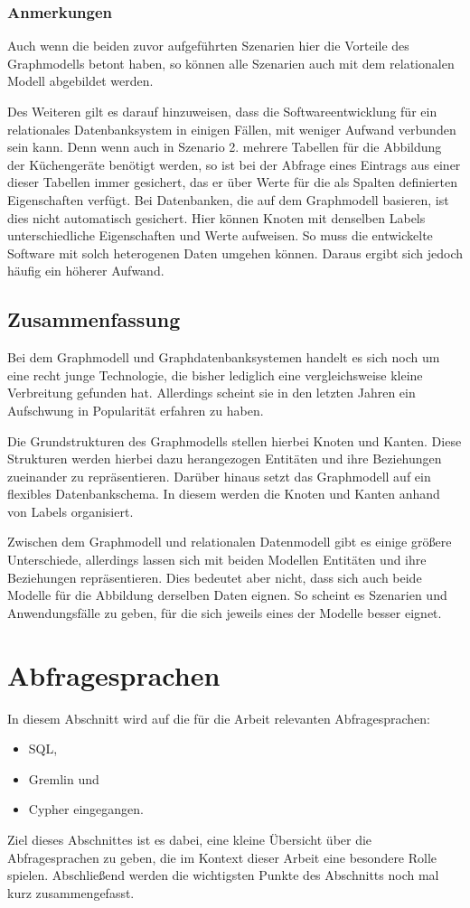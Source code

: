 \subsubsection{Anmerkungen}
Auch wenn die beiden zuvor aufgeführten Szenarien hier die Vorteile des Graphmodells betont haben, so können alle Szenarien auch mit dem relationalen Modell abgebildet werden. 

Des Weiteren gilt es darauf hinzuweisen, dass die Softwareentwicklung für ein relationales Datenbanksystem in einigen Fällen, mit weniger Aufwand verbunden sein kann. Denn wenn auch in Szenario 2. mehrere Tabellen für die Abbildung der Küchengeräte benötigt werden, so ist bei der Abfrage eines Eintrags aus einer dieser Tabellen immer gesichert, das er über Werte für die als Spalten definierten Eigenschaften verfügt. Bei Datenbanken, die auf dem Graphmodell basieren, ist dies nicht automatisch gesichert. Hier können Knoten mit denselben Labels unterschiedliche Eigenschaften und Werte aufweisen. So muss die entwickelte Software mit solch heterogenen Daten umgehen können. Daraus ergibt sich jedoch häufig ein höherer Aufwand. 

\subsection{Zusammenfassung}
Bei dem Graphmodell und Graphdatenbanksystemen handelt es sich noch um eine recht junge Technologie, die bisher lediglich eine vergleichsweise kleine Verbreitung gefunden hat. Allerdings scheint sie in den letzten Jahren ein Aufschwung in Popularität erfahren zu haben. 

Die Grundstrukturen des Graphmodells stellen hierbei Knoten und Kanten. Diese Strukturen werden hierbei dazu herangezogen Entitäten und ihre Beziehungen zueinander zu repräsentieren. Darüber hinaus setzt das Graphmodell auf ein flexibles Datenbankschema. In diesem werden die Knoten und Kanten anhand von Labels organisiert.

Zwischen dem Graphmodell und relationalen Datenmodell gibt es einige größere Unterschiede, allerdings lassen sich mit beiden Modellen Entitäten und ihre Beziehungen repräsentieren. Dies bedeutet aber nicht, dass sich auch beide Modelle für die Abbildung derselben Daten eignen. So scheint es Szenarien und Anwendungsfälle zu geben, für die sich jeweils eines der Modelle besser eignet. 

\section{Abfragesprachen}
In diesem Abschnitt wird auf die für die Arbeit relevanten Abfragesprachen:
\begin{itemize}
    \item SQL,
    \item Gremlin und
    \item Cypher eingegangen.
\end{itemize}
Ziel dieses Abschnittes ist es dabei, eine kleine Übersicht über die Abfragesprachen zu geben, die im Kontext dieser Arbeit eine besondere Rolle spielen. Abschließend werden die wichtigsten Punkte des Abschnitts noch mal kurz zusammengefasst.

